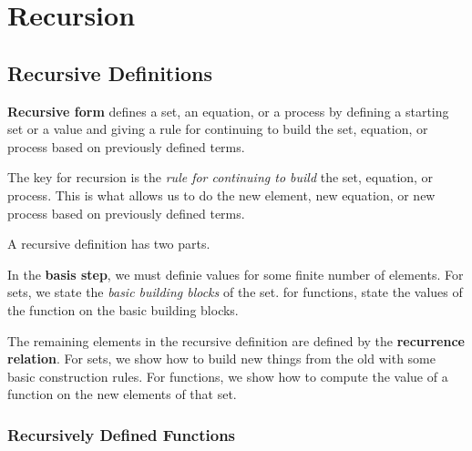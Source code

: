 \chapter{Recursion}

\section{Recursive Definitions}

\begin{defn}
  \textbf{Recursive form} defines a set, an equation, or a process by defining a starting set or a value and giving a rule for continuing to build the set, equation, or process based on previously defined terms.
\end{defn}

The key for recursion is the \emph{rule for continuing to build} the set, equation, or process. This is what allows us to do the new element, new equation, or new process based on previously defined terms.

A recursive definition has two parts.

\begin{defn}
  In the \textbf{basis step}, we must definie values for some finite number of
  elements. For sets, we state the \emph{basic building blocks} of the set. for functions, state the values of the function
  on the basic building blocks.
\end{defn}
\begin{defn}
  The remaining elements in the recursive definition are defined by the
  \textbf{recurrence relation}. For sets, we show how
  to build new things from the old with some basic construction rules. For
  functions, we show how to compute the value of a function on the new elements
  of that set.
\end{defn}

\subsection{Recursively Defined Functions}

